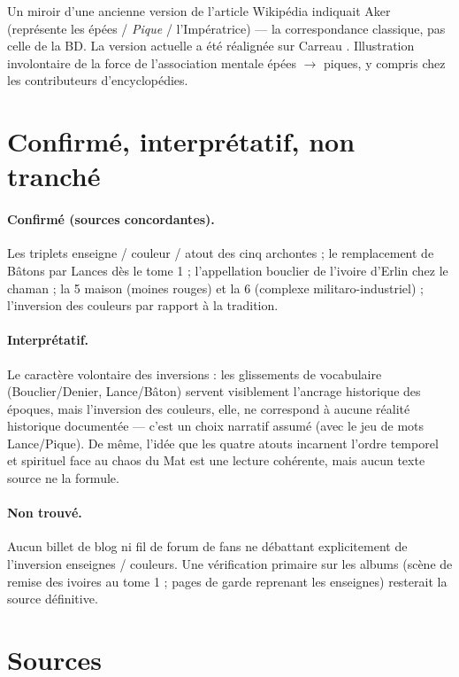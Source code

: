 \documentclass[11pt,a5paper]{article}
\begin{document}
Un miroir d'une ancienne version de l'article Wikipédia indiquait
\og Aker (représente les épées / \emph{Pique} / l'Impératrice) \fg{} --- la
correspondance classique, pas celle de la BD. La version actuelle a été
réalignée sur \og Carreau \fg{}. Illustration involontaire de la force de
l'association mentale épées $\rightarrow$ piques, y compris chez les
contributeurs d'encyclopédies.

\section{Confirmé, interprétatif, non tranché}

\paragraph{Confirmé (sources concordantes).}
Les triplets enseigne / couleur / atout des cinq archontes ; le
remplacement de \og Bâtons \fg{} par \og Lances \fg{} dès le tome 1 ;
l'appellation \og bouclier \fg{} de l'ivoire d'Erlin chez le chaman ; la
5\ieme{} maison (moines rouges) et la 6\ieme{} (complexe militaro-industriel) ;
l'inversion des couleurs par rapport à la tradition.

\paragraph{Interprétatif.}
Le caractère \og volontaire \fg{} des inversions : les glissements de
vocabulaire (Bouclier/Denier, Lance/Bâton) servent visiblement l'ancrage
historique des époques, mais l'inversion des couleurs, elle, ne correspond
à aucune réalité historique documentée --- c'est un choix narratif assumé
(avec le jeu de mots Lance/Pique). De même, l'idée que les quatre atouts
\og incarnent l'ordre temporel et spirituel \fg{} face au chaos du Mat est
une lecture cohérente, mais aucun texte source ne la formule.

\paragraph{Non trouvé.}
Aucun billet de blog ni fil de forum de fans ne débattant explicitement de
l'inversion enseignes / couleurs. Une vérification primaire sur les albums
(scène de remise des ivoires au tome 1 ; pages de garde reprenant les
enseignes) resterait la source définitive.

\section{Sources}
\end{document}
